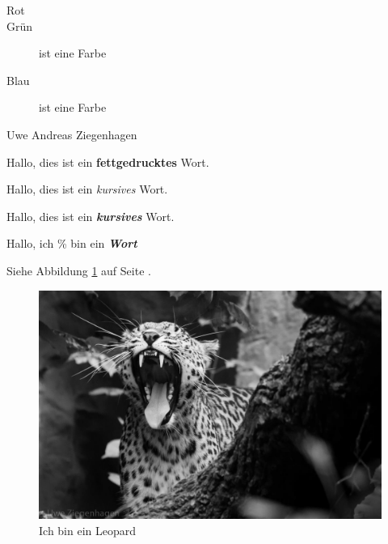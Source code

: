 \documentclass[ngerman]{scrreprt}
\newcommand{\uzi}{Uwe Andreas Ziegenhagen}
\newcommand{\fk}[1]{\textbf{\textit{#1}}}
\begin{document}
\begin{description}
\item[Rot] \blindtext
\item[Grün] ist eine Farbe
\item[Blau] ist eine Farbe
\end{description}

\uzi

Hallo, dies ist ein \textbf{fettgedrucktes} Wort.

Hallo, dies ist ein \textit{kursives} Wort.

Hallo, dies ist ein \textbf{\textit{kursives}} Wort.

Hallo, ich \% bin ein \fk{Wort}

Siehe Abbildung \ref{fig:leopard} auf Seite \pageref{fig:leopard}.

\begin{figure}[htb]
\begin{center}
\includegraphics[width=\textwidth]{hallowelt}
\caption{Ich bin ein Leopard}\label{fig:leopard}
\end{center}
\end{figure}
\end{document}
